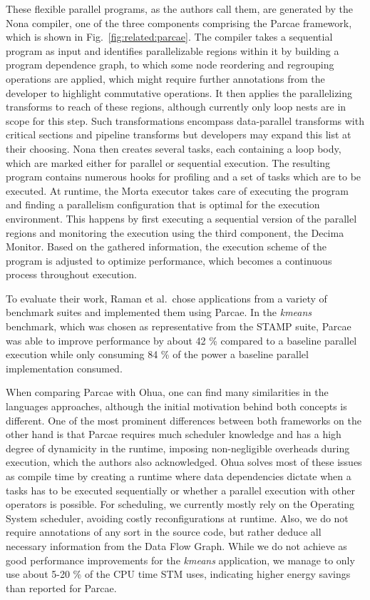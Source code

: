 These flexible parallel programs, as the authors call them, are generated by the Nona compiler, one of the three components comprising the Parcae framework, which is shown in Fig.~\ref{fig:related:parcae}.
The compiler takes a sequential program as input and identifies parallelizable regions within it by building a program dependence graph, to which some node reordering and regrouping operations are applied, which might require further annotations from the developer to highlight commutative operations.
It then applies the parallelizing transforms to reach of these regions, although currently only loop nests are in scope for this step.
Such transformations encompass data-parallel transforms with critical sections and pipeline transforms but developers may expand this list at their choosing.
Nona then creates several tasks, each containing a loop body, which are marked either for parallel or sequential execution.
The resulting program contains numerous hooks for profiling and a set of tasks which are to be executed.
At runtime, the Morta executor takes care of executing the program and finding a parallelism configuration that is optimal for the execution environment.
This happens by first executing a sequential version of the parallel regions and monitoring the execution using the third component, the Decima Monitor.
Based on the gathered information, the execution scheme of the program is adjusted to optimize performance, which becomes a continuous process throughout execution. %

To evaluate their work, Raman et al.\ chose applications from a variety of benchmark suites and implemented them using Parcae.
In the \emph{kmeans} benchmark, which was chosen as representative from the STAMP suite, Parcae was able to improve performance by about 42 \% compared to a baseline parallel execution while only consuming 84 \% of the power a baseline parallel implementation consumed.

When comparing Parcae with Ohua, one can find many similarities in the languages approaches, although the initial motivation behind both concepts is different.
One of the most prominent differences between both frameworks on the other hand is that Parcae requires much scheduler knowledge and has a high degree of dynamicity in the runtime, imposing non-negligible overheads during execution, which the authors also acknowledged.
Ohua solves most of these issues as compile time by creating a runtime where data dependencies dictate when a tasks has to be executed sequentially or whether a parallel execution with other operators is possible.
For scheduling, we currently mostly rely on the Operating System scheduler, avoiding costly reconfigurations at runtime.
Also, we do not require annotations of any sort in the source code, but rather deduce all necessary information from the Data Flow Graph.
While we do not achieve as good performance improvements for the \emph{kmeans} application, we manage to only use about 5-20 \% of the CPU time STM uses, indicating higher energy savings than reported for Parcae.
